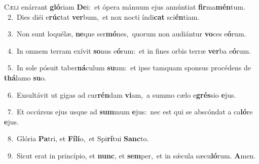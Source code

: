 \lettrine{\initial\textcolor{\initialcolor}{C}}{æli} enárrant \textbf{gló}\-riam \textbf{De}\-i:~\star et ópera mánuum ejus annúntiat \textbf{fir}\-ma\-\textbf{mén}\-tum.\\
{\numbfont\textcolor{\numbcolor}{~2.}}~Dies diéi e\-\textbf{rúc}\-tat \textbf{ver}\-bum,~\star et nox nocti índi\textbf{cat} sci\-\textbf{én}\-tiam.\par
{\numbfont\textcolor{\numbcolor}{~3.}}~Non sunt loquélæ, \textbf{ne}\-que ser\-\textbf{mó}\-nes,~\star quorum non audiántur \textbf{vo}\-ces e\-\textbf{ó}\-rum.\par
{\numbfont\textcolor{\numbcolor}{~4.}}~In omnem terram exívit \textbf{so}\-nus e\-\textbf{ó}\-rum:~\star et in fines orbis terræ \textbf{ver}\-ba e\-\textbf{ó}\-rum.\par
{\numbfont\textcolor{\numbcolor}{~5.}}~In sole pósuit taber\-\textbf{ná}\-culum \textbf{su}\-um:~\star et ipse tamquam sponsus procédens de \textbf{thá}\-lamo \textbf{su}\-o.\par
{\numbfont\textcolor{\numbcolor}{~6.}}~Exsultávit ut gigas ad cur\-\textbf{rén}\-dam \textbf{vi}\-am,~\star a summo cælo e\-\textbf{grés}\-sio \textbf{e}\-jus.\par
{\numbfont\textcolor{\numbcolor}{~7.}}~Et occúrsus ejus usque ad \textbf{sum}\-mum \textbf{e}\-jus:~\star nec est qui se abscóndat a ca\-\textbf{ló}\-re \textbf{e}\-jus.\par
{\numbfont\textcolor{\numbcolor}{~8.}}~Glória \textbf{Pa}\-tri, et \textbf{Fí}\-\textbf{li}o,~\star et Spi\-\textbf{rí}\-tui \textbf{Sanc}\-to.\par
{\numbfont\textcolor{\numbcolor}{~9.}}~Sicut erat in princípio, et \textbf{nunc}\-, et \textbf{sem}\-per,~\star et in sǽcula sæcu\-\textbf{ló}\-rum. \textbf{A}\-men.\par
